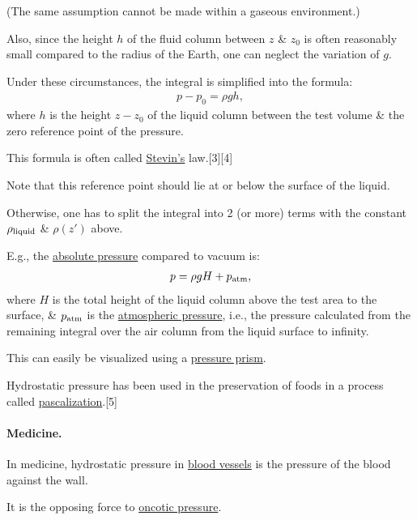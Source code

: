 \documentclass{article}
\begin{document}
(The same assumption cannot be made within a gaseous environment.)

Also, since the height $h$ of the fluid column between $z$ \& $z_0$ is often reasonably small compared to the radius of the Earth, one can neglect the variation of $g$.

Under these circumstances, the integral is simplified into the formula:
\begin{align*}
	p - p_0 = \rho gh,
\end{align*}
where $h$ is the height $z - z_0$ of the liquid column between the test volume \& the zero reference point of the pressure.

This formula is often called \href{https://en.wikipedia.org/wiki/Simon_Stevin}{Stevin's} law.[3][4]

Note that this reference point should lie at or below the surface of the liquid.

Otherwise, one has to split the integral into 2 (or more) terms with the constant $\rho_{\rm liquid}$ \& $\rho(z')$ above.

E.g., the \href{https://en.wikipedia.org/wiki/Pressure_measurement#Absolute,_gauge_and_differential_pressures_-_zero_reference}{absolute pressure} compared to vacuum is:
\begin{align*}
	p = \rho gH + p_{\rm atm},
\end{align*}
where $H$ is the total height of the liquid column above the test area to the surface, \& $p_{\rm atm}$ is the \href{https://en.wikipedia.org/wiki/Atmospheric_pressure}{atmospheric pressure}, i.e., the pressure calculated from the remaining integral over the air column from the liquid surface to infinity.

This can easily be visualized using a \href{https://en.wikipedia.org/wiki/Pressure_prism}{pressure prism}.

%
Hydrostatic pressure has been used in the preservation of foods in a process called \href{https://en.wikipedia.org/wiki/Pascalization}{pascalization}.[5]

\paragraph{Medicine.} In medicine, hydrostatic pressure in \href{https://en.wikipedia.org/wiki/Blood_vessel}{blood vessels} is the pressure of the blood against the wall.

It is the opposing force to \href{https://en.wikipedia.org/wiki/Oncotic_pressure}{oncotic pressure}.
\end{document}
